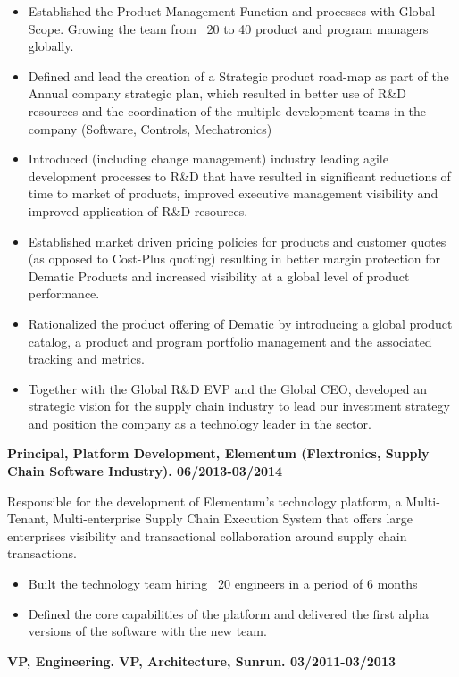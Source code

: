 \documentclass{res}
\begin{document}
\begin{resume}
\begin{itemize}
    \item Established the Product Management Function and processes with Global Scope. Growing the team from ~20 to 40 product and program managers globally.
    \item Defined and lead the creation of a Strategic product road-map as part of the Annual company strategic plan, which resulted in better use of R\&D resources and the coordination of the multiple development teams in the company (Software, Controls,  Mechatronics)
    \item Introduced (including change management) industry leading agile development processes to R\&D that have resulted in significant reductions of time to market of products, improved executive management visibility and improved application of R\&D resources.
    \item Established market driven pricing policies for products and customer quotes (as opposed to Cost-Plus quoting) resulting in better margin protection for Dematic Products and increased visibility at a global level of product performance.
    \item Rationalized the product offering of Dematic by introducing a global product catalog, a product and program portfolio management and the associated tracking and metrics.
    \item Together with the Global R\&D EVP and the Global CEO, developed an strategic vision for the supply chain industry to lead our investment strategy and position the company as a technology leader in the sector.
\end{itemize}

{\bf Principal, Platform Development, Elementum (Flextronics, Supply Chain Software Industry). 06/2013-03/2014}

Responsible for the development of Elementum's technology platform, a Multi-Tenant, Multi-enterprise Supply Chain Execution System that offers large enterprises visibility and transactional collaboration around supply chain transactions.
\begin{itemize}
    \item Built the technology team hiring ~20 engineers in a period of 6 months
    \item Defined the core capabilities of the platform and delivered the first alpha versions of the software with the new team.
\end{itemize}

{\bf VP, Engineering. VP, Architecture, Sunrun. 03/2011-03/2013}


\end{resume}
\end{document}
